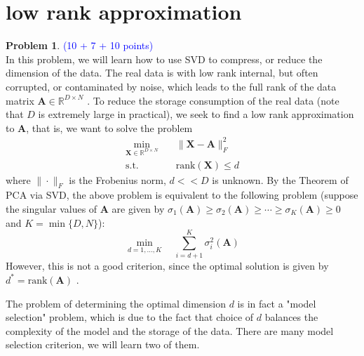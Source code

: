 \documentclass[english,onecolumn]{IEEEtran}
\begin{document}
\section{low rank approximation}

\noindent\textbf{Problem 1}.  \textcolor{blue}{(10 + 7 + 10 points)}\\
In this problem, we will learn how to use SVD to compress, or reduce the dimension of the data. The real data is with low rank internal, but often corrupted, or contaminated by noise, which leads to the full rank of the data matrix $\mathbf{A}\in\mathbb{R}^{D\times N}$ . To reduce the storage consumption of the real data (note that $D$ is extremely large in practical), we seek to find a low rank approximation to  $\mathbf{A}$, that is, we want to solve the problem
\begin{align}
    \min_{\mathbf{X}\in\mathbb{R}^{D\times N}}&\quad \|\mathbf{X}-\mathbf{A}\|_F^2\\
    \mathrm{s.t.}&\quad \mathrm{rank}(\mathbf{X})\leq d
\end{align}
where $\|\cdot\|_F$ is the Frobenius norm, $d<< D$ is unknown.
By the Theorem of PCA via SVD, the above problem is equivalent to the following problem (suppose the singular values of $\mathbf{A}$ are given by $\sigma_1(\mathbf{A})\geq\sigma_2(\mathbf{A})\geq\cdots\geq \sigma_K(\mathbf{A})\geq0$ and $K=\min\{D,N\}$):
    \begin{equation}
        \min_{d=1,\dots,K}\quad\sum_{i=d+1}^K\sigma_{i}^2(\mathbf{A})
    \end{equation}
However, this is not a good criterion, since the optimal solution is given by $d^*=\mathrm{rank}(\mathbf{A})$ .

The problem of determining the optimal dimension $d$ is in fact a "model selection" problem, which is due to the fact that choice of $d$ balances the complexity of the model and the storage of the data. There are many model selection criterion, we will learn two of them.
\end{document}
